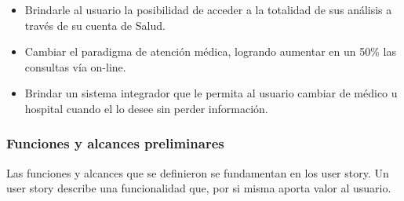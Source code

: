     \begin{itemize}
	    \item Brindarle al usuario la posibilidad de acceder a la totalidad de sus análisis a través de su cuenta de Salud.
    	\item Cambiar el paradigma de atención médica, logrando aumentar en un 50\% las consultas vía on-line.
        \item Brindar un sistema integrador que le permita al usuario cambiar de médico u hospital cuando el lo desee sin perder información.
	\end{itemize}




\subsubsection{Funciones y alcances preliminares}
Las funciones y alcances que se definieron se fundamentan en los user story. Un user story describe una funcionalidad que, por si misma aporta valor al usuario.

